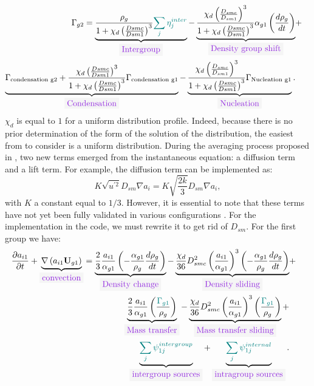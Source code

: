 \begin{equation}
\begin{aligned}
\Gamma_{g2}=\underbrace{\frac{\rho_g}{1+\chi_d \parent{\frac{Dsmc}{Dsm1}}^3}{\color{myteal}\sum_j \eta^{inter}_j}}_{\colorbox{codebackground}{\color{codekeyword3} Intergroup}}- \underbrace{\frac{\chi_d\parent{\frac{D_{smc}}{D_{sm1}}}^3}{1+\chi_d \parent{\frac{Dsmc}{Dsm1}}^3}\alpha_{g1}\parent{\frac{d\rho_{g}}{dt}}}_{\colorbox{codebackground}{\color{codekeyword3} Density\ group\ shift}}&+& \\
\underbrace{\Gamma_{\text{condensation\ g2}}+\frac{\chi_d \parent{\frac{Dsmc}{Dsm1}}^3}{1+\chi_d \parent{\frac{Dsmc}{Dsm1}}^3}\Gamma_{\text{condensation g1}}}_{\colorbox{codebackground}{\color{codekeyword3} Condensation}}-\underbrace{\frac{\chi_d\parent{\frac{D_{smc}}{D_{sm1}}}^3}{1+\chi_d \parent{\frac{Dsmc}{Dsm1}}^3}\Gamma_{\text{Nucleation g1}}}_{\colorbox{codebackground}{\color{codekeyword3} Nucleation}}.
\end{aligned}
\end{equation}
$\chi_d$ is equal to $1$ for a uniform distribution profile. Indeed, because there is no prior determination of the form of the solution of the distribution, the easiest from to consider is a uniform distribution.
During the averaging process proposed in \cite{Kataoka2012} , two new terms emerged from the instantaneous equation: a diffusion term and a lift term. For example, the diffusion term can be implemented as: 
\begin{equation}
K\sqrt{u^{\prime 2}}D_{sm}\nabla a_i=K\sqrt{\frac{2k}{3}} D_{sm}\nabla a_i,
\end{equation}
with $K$ a constant equal to $1/3$. However, it is essential to note that these terms have not yet been fully validated in various configurations \cite{Rassame2023}. For the implementation in the code, we must rewrite it to get rid of $D_{sm}$. For the first group we have:
\begin{equation}
\begin{aligned}
\frac{\partial a_{i1}}{\partial t}+\underbrace{\nabla\parent{a_{i1}\mathbf{U}_{g1}}}_{\colorbox{codebackground}{\color{codekeyword3} convection}}=\underbrace{\frac{2}{3}\frac{a_{i1}}{\alpha_{g1}}\parent{-\frac{\alpha_{g1}}{\rho_g}\frac{d \rho_g}{dt}}}_{\colorbox{codebackground}{\color{codekeyword3} Density\ change}}-\underbrace{\frac{\chi_d}{36}D_{smc}^2\parent{\frac{a_{i1}}{\alpha_{g1}}}^3\parent{-\frac{\alpha_{g1}}{\rho_g}\frac{d \rho_g}{dt}}}_{\colorbox{codebackground}{\color{codekeyword3} Density\ sliding}} &+& \\\underbrace{\frac{2}{3}\frac{a_{i1}}{\alpha_{g1}}\parent{\frac{\color{myteal}\Gamma_{g1}}{\rho_g}}}_{\colorbox{codebackground}{\color{codekeyword3} Mass\ transfer}}-\underbrace{\frac{\chi_d}{36}D_{smc}^2\parent{\frac{a_{i1}}{\alpha_{g1}}}^3\parent{\frac{\color{myteal}\Gamma_{g1}}{\rho_g}}}_{\colorbox{codebackground}{\color{codekeyword3} Mass\ transfer\ sliding}}+& \\\underbrace{\color{myteal}\sum_j \psi^{intergroup}_{1j}}_{\colorbox{codebackground}{\color{codekeyword3} intergroup\ sources}}+\underbrace{\color{myteal}\sum_j \psi^{internal}_{1j}}_{\colorbox{codebackground}{\color{codekeyword3} intragroup sources}}.
\end{aligned}
\end{equation}
